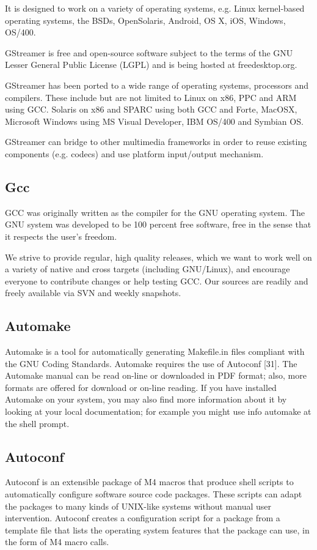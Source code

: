\documentclass[12pt,a4paper,oneside]{memoir}
\begin{document}
It is designed to work on a variety of operating systems, e.g. Linux kernel-based operating systems, the BSDs, OpenSolaris, Android, OS X, iOS, Windows, OS/400.

GStreamer is free and open-source software subject to the terms of the GNU Lesser General Public License (LGPL) and is being hosted at freedesktop.org.
 	
GStreamer has been ported to a wide range of operating systems, processors and compilers. These include but are not limited to Linux on x86, PPC and ARM using GCC. Solaris on x86 and SPARC using both GCC and Forte, MacOSX, Microsoft Windows using MS Visual Developer, IBM OS/400 and Symbian OS.

GStreamer can bridge to other multimedia frameworks in order to reuse existing components (e.g. codecs) and use platform input/output mechanism.\\

\subsection{Gcc}
GCC was originally written as the compiler for the GNU operating system. The GNU system was developed to be 100 percent free software, free in the sense that it respects the user's freedom.

We strive to provide regular, high quality releases, which we want to work well on a variety of native and cross targets (including GNU/Linux), and encourage everyone to contribute changes or help testing GCC. Our sources are readily and freely available via SVN and weekly snapshots.\\

\subsection{Automake} 
Automake is a tool for automatically generating Makefile.in files compliant with the GNU Coding Standards. Automake requires the use of Autoconf [31]. The Automake manual can be read on-line or downloaded in PDF format; also, more formats are offered for download or on-line reading. If you have installed Automake on your system, you may also find more information about it by looking at your local documentation; for example you might use info automake at the shell prompt. \\
 
\subsection{Autoconf}
Autoconf is an extensible package of M4 macros that produce shell scripts to automatically configure software source code packages. These scripts can adapt the packages to many kinds of UNIX-like systems without manual user intervention. Autoconf creates a configuration script for a package from a template file that lists the operating system features that the package can use, in the form of M4 macro calls.\\
\end{document}
